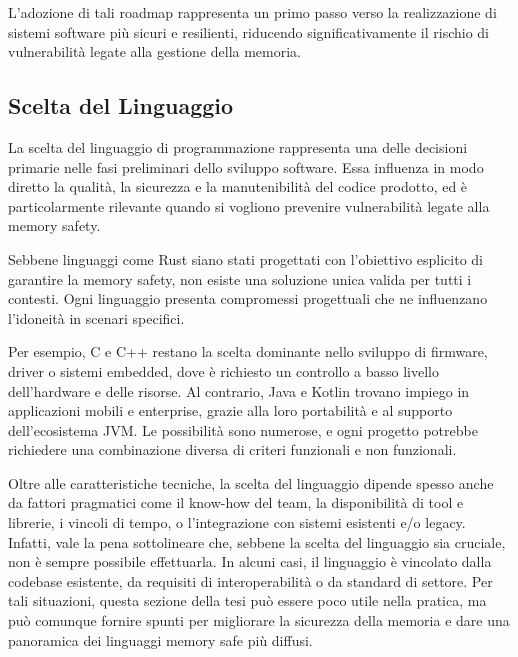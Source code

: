 L'adozione di tali roadmap rappresenta un primo passo verso la realizzazione di sistemi
software più sicuri e resilienti, riducendo significativamente il rischio di
vulnerabilità legate alla gestione della memoria.

\subsection{Scelta del Linguaggio}
\label{sec:linguaggio}

La scelta del linguaggio di programmazione rappresenta una delle decisioni primarie
nelle fasi preliminari dello sviluppo software. Essa influenza in modo diretto
la qualità, la sicurezza e la manutenibilità del codice prodotto, ed è
particolarmente rilevante quando si vogliono prevenire vulnerabilità legate alla
memory safety.

Sebbene linguaggi come Rust siano stati progettati con l'obiettivo esplicito di
garantire la memory safety, non esiste una soluzione unica valida per tutti i contesti.
Ogni linguaggio presenta compromessi progettuali che ne influenzano l'idoneità
in scenari specifici.

Per esempio, C e C++ restano la scelta dominante nello sviluppo di firmware,
driver o sistemi embedded, dove è richiesto un controllo a basso livello dell'hardware
e delle risorse. Al contrario, Java e Kotlin trovano impiego in applicazioni mobili
e enterprise, grazie alla loro portabilità e al supporto dell'ecosistema JVM. Le
possibilità sono numerose, e ogni progetto potrebbe richiedere una combinazione
diversa di criteri funzionali e non funzionali.

Oltre alle caratteristiche tecniche, la scelta del linguaggio dipende spesso anche
da fattori pragmatici come il know-how del team, la disponibilità di tool e
librerie, i vincoli di tempo, o l'integrazione con sistemi esistenti e/o legacy.
Infatti, vale la pena sottolineare che, sebbene la scelta del linguaggio sia cruciale,
non è sempre possibile effettuarla. In alcuni casi, il linguaggio è vincolato
dalla codebase esistente, da requisiti di interoperabilità o da standard di settore.
Per tali situazioni, questa sezione della tesi può essere poco utile nella pratica,
ma può comunque fornire spunti per migliorare la sicurezza della memoria e dare
una panoramica dei linguaggi memory safe più diffusi.

